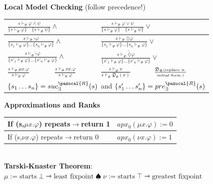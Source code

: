 \documentclass{article}
\newcommand{\Rb}{\pazocal{R}}
\newcommand{\Db}{\mathfrak{D}}
\begin{document}
\begin{multicols}{4}
\textbf{Local Model Checking} (follow precedence!)
\begin{tabular}{|l|l|l|l|}
\hline
\multicolumn{2}{|l|}{\small$\frac{s \vdash_{\Phi} \varphi \wedge \psi}{\{s \vdash_{\Phi} \varphi \} \quad \{s \vdash_{\Phi} \psi\}} \wedge$} & \multicolumn{2}{|l|}{\small$\frac{s \vdash_{\Phi} \varphi \vee \psi}{\{s \vdash_{\Phi} \varphi \} \quad \{s \vdash_{\Phi} \psi\}} \vee $}\\ \hline
\multicolumn{2}{|l|}{\small$\frac{s \vdash_{\Phi} \square \varphi}{\{s_1 \vdash_{\Phi} \varphi\} \dots \{s_n \vdash_{\Phi} \varphi\}} \wedge$}&\multicolumn{2}{|l|}{\small$\frac{s \vdash_{\Phi} \diamondsuit \varphi}{\{s_1 \vdash_{\Phi} \varphi\} \dots \{s_n \vdash_{\Phi} \varphi\}} \vee$} \\
 \hline
\multicolumn{2}{|l|}{\small$\frac{s \vdash_{\Phi} \overleftarrow{\square} \varphi}{\{s'_1 \vdash_{\Phi} \varphi \}\dots \{ s'_n \vdash_{\Phi} \varphi\}} \wedge$} &\multicolumn{2}{|l|}{\small$\frac{s \vdash_{\Phi} \overleftarrow{\diamondsuit} \varphi}{\{s'_1 \vdash_{\Phi} \varphi \}\dots \{ s'_n \vdash_{\Phi} \varphi\}} \vee$} \\
 \hline
$\frac{s \vdash_{\Phi} \mu x.\varphi}{s \vdash_{\Phi} \varphi}$ &$\frac{s \vdash_{\Phi} \nu x.\varphi}{s \vdash_{\Phi} \varphi}$&$\frac{s \vdash_{\Phi} x}{s \vdash_{\Phi} \Db_{\Phi}(x)}$&$\frac{\Db_{\Phi}\text{\tiny (replace w.}}{\text{\tiny initial form.)}}$\\
 \hline
\multicolumn{4}{|l|}{$\{s_1 \dots s_n \}=suc^{\Rb}_{\exists}({s})$ and $\{s'_1 \dots s'_n \}=pre^{\Rb}_{\exists}({s})$}\\ \hline 
\end{tabular}
\textbf{Approximations and Ranks}
\begin{tabular}{|l|l|}
\hline
If (s,$\mu x.\varphi$) repeats$\rightarrow$return 1&$apx_0(\mu x.\varphi):=0$\\ \hline
If (s,$\nu x.\varphi$) repeats$\rightarrow$return 0& $apx_0(\nu x.\varphi):=1$\\ \hline
\end{tabular} \\


\textbf{Tarski-Knaster Theorem}: $\mu := \text{starts} \; \bot \rightarrowtriangle \text{least fixpoint} \;\spadesuit \; \nu :=\text{starts} \;\top \rightarrowtriangle \text{greatest fixpoint}$


\end{multicols}
\end{document}
